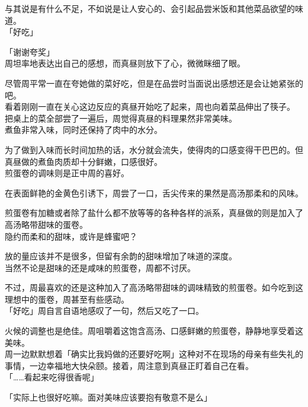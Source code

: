 与其说是有什么不足，不如说是让人安心的、会引起品尝米饭和其他菜品欲望的味道。\\

「好吃」

「谢谢夸奖」\\

周坦率地表达出自己的感想，而真昼则放下了心，微微眯细了眼。

尽管周平常一直在夸她做的菜好吃，但是在品尝时当面说出感想还是会让她紧张的吧。\\

看着刚刚一直在关心这边反应的真昼开始吃了起来，周也向着菜品伸出了筷子。\\

把桌上的菜全部尝了一遍后，周觉得真昼的料理果然非常美味。\\

煮鱼非常入味，同时还保持了肉中的水分。

为了做到入味而长时间加热的话，水分就会流失，使得肉的口感变得干巴巴的。但真昼做的煮鱼肉质却十分鲜嫩，口感很好。\\

煎蛋卷的调味则是正中周的喜好。

在表面鲜艳的金黄色引诱下，周尝了一口，舌尖传来的果然是高汤那柔和的风味。

煎蛋卷有加糖或者除了盐什么都不放等等的各种各样的派系，真昼做的则是加入了高汤略带甜味的蛋卷。\\

隐约而柔和的甜味，或许是蜂蜜吧？

放的量应该并不是很多，但留有余韵的甜味增加了味道的深度。\\

当然不论是甜味的还是咸味的煎蛋卷，周都不讨厌。

不过，周最喜欢的还是这种加入了高汤略带甜味的调味精致的煎蛋卷。如今吃到这理想中的蛋卷，周甚至有些感动。\\

「好吃」周自言自语地感叹了一句，然后又吃了一口。

火候的调整也是绝佳。周咀嚼着这饱含高汤、口感鲜嫩的煎蛋卷，静静地享受着这美味。\\

周一边默默想着「确实比我妈做的还要好吃啊」这种对不在现场的母亲有些失礼的事情，一边幸福地大快朵颐。接着，周注意到真昼正盯着自己在看。\\

「……看起来吃得很香呢」

「实际上也很好吃嘛。面对美味应该要抱有敬意不是么」

